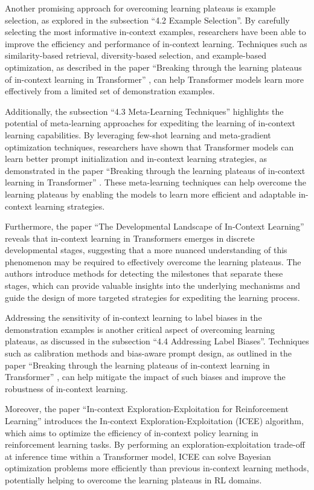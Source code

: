 \documentclass[11pt]{article}
\begin{document}
Another promising approach for overcoming learning plateaus is example selection, as explored in the subsection ``4.2 Example Selection''. By carefully selecting the most informative in-context examples, researchers have been able to improve the efficiency and performance of in-context learning. Techniques such as similarity-based retrieval, diversity-based selection, and example-based optimization, as described in the paper ``Breaking through the learning plateaus of in-context learning in Transformer'' \cite{ref5}, can help Transformer models learn more effectively from a limited set of demonstration examples.

Additionally, the subsection ``4.3 Meta-Learning Techniques'' highlights the potential of meta-learning approaches for expediting the learning of in-context learning capabilities. By leveraging few-shot learning and meta-gradient optimization techniques, researchers have shown that Transformer models can learn better prompt initialization and in-context learning strategies, as demonstrated in the paper ``Breaking through the learning plateaus of in-context learning in Transformer'' \cite{ref5}. These meta-learning techniques can help overcome the learning plateaus by enabling the models to learn more efficient and adaptable in-context learning strategies.

Furthermore, the paper ``The Developmental Landscape of In-Context Learning'' \cite{ref104} reveals that in-context learning in Transformers emerges in discrete developmental stages, suggesting that a more nuanced understanding of this phenomenon may be required to effectively overcome the learning plateaus. The authors introduce methods for detecting the milestones that separate these stages, which can provide valuable insights into the underlying mechanisms and guide the design of more targeted strategies for expediting the learning process.

Addressing the sensitivity of in-context learning to label biases in the demonstration examples is another critical aspect of overcoming learning plateaus, as discussed in the subsection ``4.4 Addressing Label Biases''. Techniques such as calibration methods and bias-aware prompt design, as outlined in the paper ``Breaking through the learning plateaus of in-context learning in Transformer'' \cite{ref5}, can help mitigate the impact of such biases and improve the robustness of in-context learning.

Moreover, the paper ``In-context Exploration-Exploitation for Reinforcement Learning'' \cite{ref47} introduces the In-context Exploration-Exploitation (ICEE) algorithm, which aims to optimize the efficiency of in-context policy learning in reinforcement learning tasks. By performing an exploration-exploitation trade-off at inference time within a Transformer model, ICEE can solve Bayesian optimization problems more efficiently than previous in-context learning methods, potentially helping to overcome the learning plateaus in RL domains.
\end{document}
